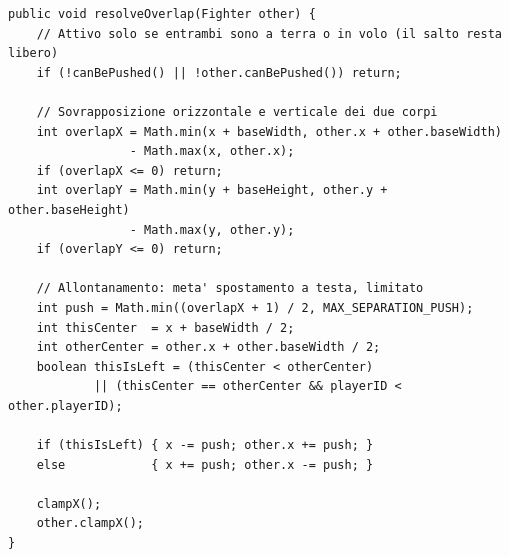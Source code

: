 \documentclass[12pt,a4paper]{report}
\begin{document}
\begin{lstlisting}[style=java, caption={La separazione dei corpi sovrapposti (\texttt{Fighter.resolveOverlap()}).}, label=lst:pushbox]
public void resolveOverlap(Fighter other) {
    // Attivo solo se entrambi sono a terra o in volo (il salto resta libero)
    if (!canBePushed() || !other.canBePushed()) return;

    // Sovrapposizione orizzontale e verticale dei due corpi
    int overlapX = Math.min(x + baseWidth, other.x + other.baseWidth)
                 - Math.max(x, other.x);
    if (overlapX <= 0) return;
    int overlapY = Math.min(y + baseHeight, other.y + other.baseHeight)
                 - Math.max(y, other.y);
    if (overlapY <= 0) return;

    // Allontanamento: meta' spostamento a testa, limitato
    int push = Math.min((overlapX + 1) / 2, MAX_SEPARATION_PUSH);
    int thisCenter  = x + baseWidth / 2;
    int otherCenter = other.x + other.baseWidth / 2;
    boolean thisIsLeft = (thisCenter < otherCenter)
            || (thisCenter == otherCenter && playerID < other.playerID);

    if (thisIsLeft) { x -= push; other.x += push; }
    else            { x += push; other.x -= push; }

    clampX();
    other.clampX();
}
\end{lstlisting}
\end{document}
